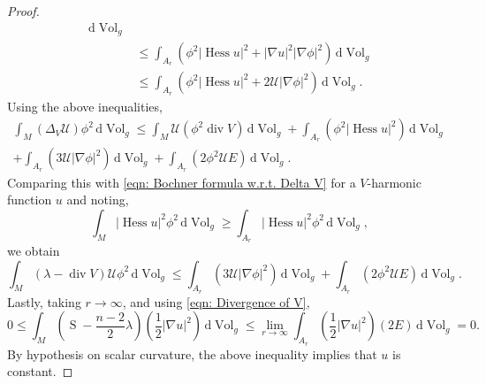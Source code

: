 \documentclass{amsart}
\newcommand{\abs}[1]{\left| #1 \right|}
\newcommand{\derivative}{\mathrm{d}}
\newcommand{\brackets}[1]{\left( #1 \right)}
\DeclareMathOperator*{\scalar}{S}
\DeclareMathOperator*{\divergence}{div}
\DeclareMathOperator*{\hessian}{Hess}
\DeclareMathOperator*{\Vol}{Vol}
\theoremstyle{plain}
\theoremstyle{plain}
\theoremstyle{plain}
\theoremstyle{plain}
\theoremstyle{remark}
\begin{document}
\begin{proof}
\begin{align*}
                \, \derivative {\Vol}_g \\
            &\leq \int_{A_r} \brackets{ \phi^2 \abs{\hessian u}^2 
                + \abs{\nabla u}^2 \abs{\nabla \phi}^2 }
                \, \derivative {\Vol}_g \\
            &\leq \int_{A_r} \brackets{ \phi^2 \abs{\hessian u}^2 
                + 2\mathcal{U} \abs{\nabla \phi}^2 }
                \, \derivative {\Vol}_g .
    \end{align*}
    Using the above inequalities, 
    \begin{multline*}
        \int_M  \brackets{ \Delta_V \mathcal{U}} \phi^2 \, \derivative {\Vol}_g 
            \leq \int_M \mathcal{U}  \left( \phi^2 \divergence V  \right) 
                \, \derivative  {\Vol}_g 
                + \int_{A_r} \brackets{ \phi^2 \abs{\hessian u}^2  }
                \, \derivative {\Vol}_g \\
            +\int_{A_r} \brackets{  3\mathcal{U} \abs{\nabla \phi}^2}
                \, \derivative {\Vol}_g 
            + \int_{A_r} (2\phi^2 \mathcal{U} E) \, \derivative {\Vol}_g.
    \end{multline*}
    Comparing this with \cref{eqn: Bochner formula w.r.t. Delta V} for a $V$-harmonic function $u$
    and noting, 
    $$ \int_M \abs{\hessian u}^2 \phi^2 \, \derivative {\Vol}_g \geq 
        \int_{A_r} \abs{\hessian u}^2 \phi^2 \, \derivative  {\Vol}_g, $$
    we obtain
    \begin{equation*}
        \int_M \brackets{ \lambda - \divergence V } \mathcal{U} \phi^2
                 \, \derivative  {\Vol}_g 
            \leq \int_{A_r} \brackets{  3\mathcal{U} \abs{\nabla \phi}^2}
                \, \derivative {\Vol}_g 
            + \int_{A_r} (2\phi^2 \mathcal{U} E) \, \derivative {\Vol}_g.
    \end{equation*}
    Lastly, taking $r\to \infty$, and using \cref{eqn: Divergence of V},
    \begin{equation*}
        0 \leq \int_M  \brackets{ \scalar - \frac{n-2}{2} \lambda } \brackets{ \frac{1}{2} \abs{\nabla u}^2 }
                  \, \derivative {\Vol}_g
            \leq \lim_{r\to \infty} \int_{A_r} \brackets{ \frac{1}{2} \abs{\nabla u}^2 } \left(2 E \right) 
                \, \derivative {\Vol}_g =0.
    \end{equation*}
    By hypothesis on scalar curvature, the above inequality implies that $u$ is constant. 
\end{proof}


\end{document}
